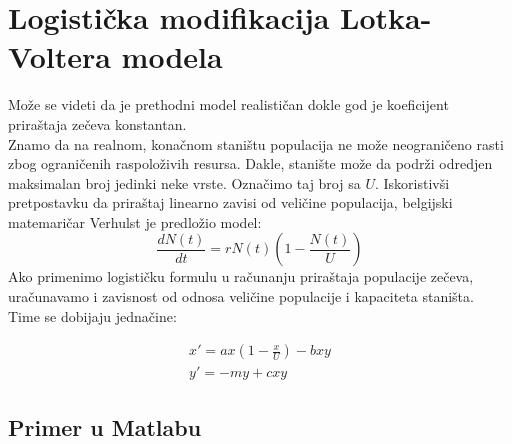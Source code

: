 \documentclass[a4paper]{article}
\begin{document}
\section{Logistička modifikacija Lotka-Voltera modela}
\label{sec:log_mod}
Može se videti da je prethodni model realističan dokle god je koeficijent priraštaja zečeva konstantan.\\
Znamo da na realnom, konačnom staništu populacija ne može neograničeno rasti zbog
ograničenih raspoloživih resursa. Dakle, stanište može da podrži odredjen maksimalan broj
jedinki neke vrste. Označimo taj broj sa $U$. Iskoristivši pretpostavku
da priraštaj linearno zavisi od veličine populacija, belgijski matemaričar Verhulst je predložio model:
	\begin{equation}
		\frac{dN(t)}{dt}=rN (t) (1 - \frac{N (t)}{U})
	\end{equation}
Ako primenimo logističku formulu u računanju priraštaja populacije zečeva, uračunavamo i zavisnost
od odnosa veličine populacije i kapaciteta staništa.\\
Time se dobijaju jednačine:

    \begin{equation}
        \label{eq:log_mod}
        \begin{aligned}
            x' = ax(1 - \frac{x}{U}) - bxy\\
            y' = -my + cxy
        \end{aligned}
	\end{equation}

\subsection{Primer u Matlabu}
\label{sub:log_mod_matlab}


\end{document}
